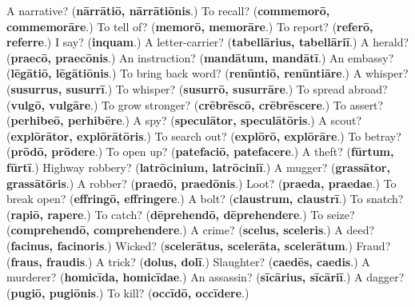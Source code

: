 \begin{tcolorbox}[breakable,colback=teal!4,colframe=teal!35!black,title={Before you move on}]
A narrative? (\textbf{nārrātiō, nārrātiōnis}.) To recall? (\textbf{commemorō, commemorāre}.) To tell of? (\textbf{memorō, memorāre}.) To report? (\textbf{referō, referre}.) I say? (\textbf{inquam}.) A letter-carrier? (\textbf{tabellārius, tabellāriī}.) A herald? (\textbf{praecō, praecōnis}.) An instruction? (\textbf{mandātum, mandātī}.) An embassy? (\textbf{lēgātiō, lēgātiōnis}.) To bring back word? (\textbf{renūntiō, renūntiāre}.) A whisper? (\textbf{susurrus, susurrī}.) To whisper? (\textbf{susurrō, susurrāre}.) To spread abroad? (\textbf{vulgō, vulgāre}.) To grow stronger? (\textbf{crēbrēscō, crēbrēscere}.) To assert? (\textbf{perhibeō, perhibēre}.) A spy? (\textbf{speculātor, speculātōris}.) A scout? (\textbf{explōrātor, explōrātōris}.) To search out? (\textbf{explōrō, explōrāre}.) To betray? (\textbf{prōdō, prōdere}.) To open up? (\textbf{patefaciō, patefacere}.) A theft? (\textbf{fūrtum, fūrtī}.) Highway robbery? (\textbf{latrōcinium, latrōciniī}.) A mugger? (\textbf{grassātor, grassātōris}.) A robber? (\textbf{praedō, praedōnis}.) Loot? (\textbf{praeda, praedae}.) To break open? (\textbf{effringō, effringere}.) A bolt? (\textbf{claustrum, claustrī}.) To snatch? (\textbf{rapiō, rapere}.) To catch? (\textbf{dēprehendō, dēprehendere}.) To seize? (\textbf{comprehendō, comprehendere}.) A crime? (\textbf{scelus, sceleris}.) A deed? (\textbf{facinus, facinoris}.) Wicked? (\textbf{scelerātus, scelerāta, scelerātum}.) Fraud? (\textbf{fraus, fraudis}.) A trick? (\textbf{dolus, dolī}.) Slaughter? (\textbf{caedēs, caedis}.) A murderer? (\textbf{homicīda, homicīdae}.) An assassin? (\textbf{sīcārius, sīcāriī}.) A dagger? (\textbf{pugiō, pugiōnis}.) To kill? (\textbf{occīdō, occīdere}.)
\end{tcolorbox}
